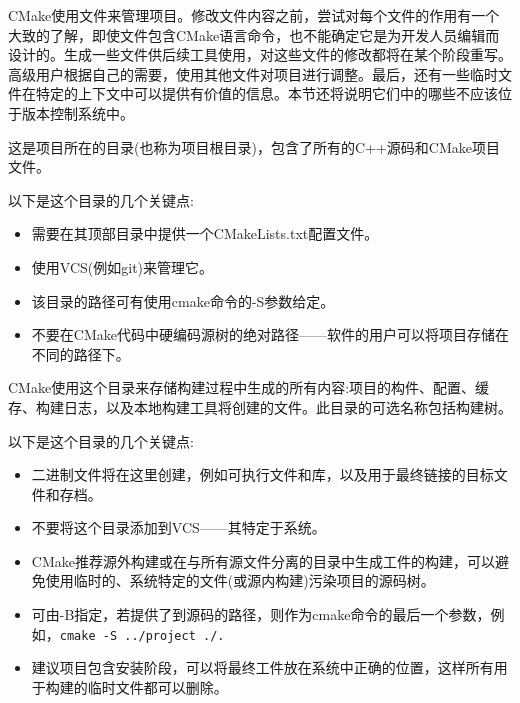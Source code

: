 
CMake使用文件来管理项目。修改文件内容之前，尝试对每个文件的作用有一个大致的了解，即使文件包含CMake语言命令，也不能确定它是为开发人员编辑而设计的。生成一些文件供后续工具使用，对这些文件的修改都将在某个阶段重写。高级用户根据自己的需要，使用其他文件对项目进行调整。最后，还有一些临时文件在特定的上下文中可以提供有价值的信息。本节还将说明它们中的哪些不应该位于版本控制系统中。


这是项目所在的目录(也称为项目根目录)，包含了所有的C++源码和CMake项目文件。

以下是这个目录的几个关键点:

\begin{itemize}
\item 
需要在其顶部目录中提供一个CMakeLists.txt配置文件。

\item 
使用VCS(例如git)来管理它。

\item 
该目录的路径可有使用cmake命令的-S参数给定。

\item 
不要在CMake代码中硬编码源树的绝对路径——软件的用户可以将项目存储在不同的路径下。
\end{itemize}


CMake使用这个目录来存储构建过程中生成的所有内容:项目的构件、配置、缓存、构建日志，以及本地构建工具将创建的文件。此目录的可选名称包括构建树。

以下是这个目录的几个关键点:

\begin{itemize}
\item 
二进制文件将在这里创建，例如可执行文件和库，以及用于最终链接的目标文件和存档。

\item 
不要将这个目录添加到VCS——其特定于系统。

\item 
CMake推荐源外构建或在与所有源文件分离的目录中生成工件的构建，可以避免使用临时的、系统特定的文件(或源内构建)污染项目的源码树。

\item 
可由-B指定，若提供了到源码的路径，则作为cmake命令的最后一个参数，例如，\texttt{cmake -S ../project ./.}

\item 
建议项目包含安装阶段，可以将最终工件放在系统中正确的位置，这样所有用于构建的临时文件都可以删除。
\end{itemize}


